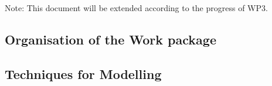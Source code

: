 Note: This document will be extended according to the progress of WP3. 



\subsection*{Organisation of the Work package}


\subsection*{Techniques for Modelling}



